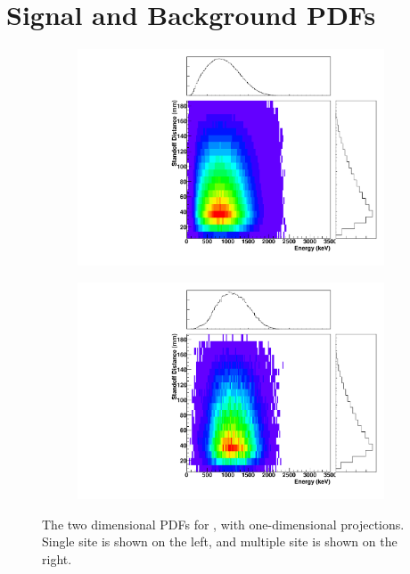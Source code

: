 \documentclass[herrin-thesis.tex]{subfiles}
\begin{document}
\chapter{Signal and Background PDFs}
\label{app:PDFs}

\begin{figure}[hp]
\centering
	\begin{subfigure}[b]{0.48\textwidth}
	\centering
	\includegraphics[width=\textwidth]{./plots/PDFs/analysis_pdf_bb2n_ss.pdf}
\end{subfigure}\hfill%
\begin{subfigure}[b]{0.48\textwidth}
	\centering
	\includegraphics[width=1\textwidth]{./plots/PDFs/analysis_pdf_bb2n_ms.pdf}
	\end{subfigure}
\caption[PDF for \twonu{}]{The two dimensional PDFs for \twonu{}, with one-dimensional projections. Single site is shown on the left, and multiple site is shown on the right.}
\label{fig:analysis_pdf_bb2n}
\end{figure}
\end{document}
